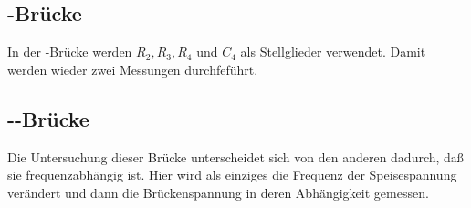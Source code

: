 \subsection{-Brücke}

In der -Brücke werden $R_2, R_3, R_4$ und $C_4$ als
Stellglieder verwendet. Damit werden wieder zwei Messungen durchfeführt.

\subsection{--Brücke}

Die Untersuchung dieser Brücke unterscheidet sich von den anderen
dadurch, daß sie frequenzabhängig ist. Hier wird als einziges die
Frequenz der Speisespannung verändert und dann die Brückenspannung in
deren Abhängigkeit gemessen.

\FloatBarrier
